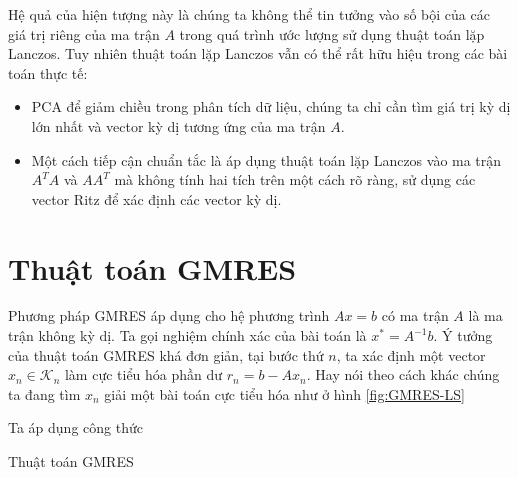 \documentclass[14pt, a4paper]{article}
\numberwithin{equation}{section}
\numberwithin{algorithm}{section}
\numberwithin{figure}{section}
\numberwithin{dl}{section}
\numberwithin{md}{section}
\numberwithin{bd}{section}
\begin{document}
Hệ quả của hiện tượng này là chúng ta không thể tin tưởng vào số bội của các giá trị riêng của ma trận $A$ trong quá trình ước lượng sử dụng thuật toán lặp Lanczos.
Tuy nhiên thuật toán lặp Lanczos vẫn có thể rất hữu hiệu trong các bài toán thực tế:

\begin{itemize}
    \item PCA để giảm chiều trong phân tích dữ liệu, chúng ta chỉ cần tìm giá trị kỳ dị lớn nhất và vector kỳ dị tương ứng của ma trận $A$.
    \item Một cách tiếp cận chuẩn tắc là áp dụng thuật toán lặp Lanczos vào ma trận $A^T A$ và $A A^T$ mà không tính hai tích trên một cách rõ ràng, sử dụng các vector Ritz để xác định các vector kỳ dị.
\end{itemize}


\section{Thuật toán GMRES}

Phương pháp GMRES áp dụng cho hệ phương trình $Ax=b$ có ma trận $A$ là ma trận không kỳ dị. Ta gọi nghiệm chính xác của bài toán là $x^* = A^{-1}b$. Ý tưởng của thuật toán GMRES khá đơn giản, tại bước thứ $n$, ta xác định một vector $x_n \in \mathcal{K}_n$ làm cực tiểu hóa phần dư $r_n = b - A x_n$. Hay nói theo cách khác chúng ta đang tìm $x_n$ giải một bài toán cực tiểu hóa như ở hình \ref{fig:GMRES-LS}



Ta áp dụng công thức
\begin{algorithm}
    \caption{Thuật toán GMRES}\label{alg:GMRES}
    \begin{algorithmic}
        \EndFor
    \end{algorithmic}
\end{algorithm}
\end{document}
